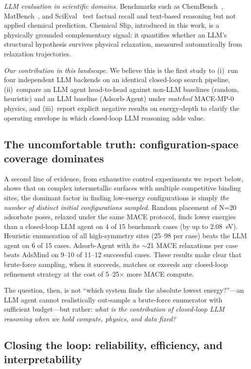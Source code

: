 \textit{LLM evaluation in scientific domains.}
Benchmarks such as ChemBench~\cite{mirza2024chembench}, MatBench~\cite{dunn2020benchmarking}, and SciEval~\cite{sun2024scieval} test factual recall and text-based reasoning but not applied chemical prediction.
Chemical Slip, introduced in this work, is a physically grounded complementary signal: it quantifies whether an LLM's structural hypothesis survives physical relaxation, measured automatically from relaxation trajectories.

\textit{Our contribution in this landscape.}
We believe this is the first study to (i)~run four independent LLM backends on an identical closed-loop search pipeline, (ii)~compare an LLM agent head-to-head against non-LLM baselines (random, heuristic) and an LLM baseline (Adsorb-Agent) under \textit{matched} MACE-MP-0 physics, and (iii)~report explicit negative results on energy-depth to clarify the operating envelope in which closed-loop LLM reasoning adds value.

\subsection{The uncomfortable truth: configuration-space coverage dominates}

A second line of evidence, from exhaustive control experiments we report below, shows that on complex intermetallic surfaces with multiple competitive binding sites, the dominant factor in finding low-energy configurations is simply \textit{the number of distinct initial configurations sampled}.
Random placement of N=20 adsorbate poses, relaxed under the same MACE protocol, finds lower energies than a closed-loop LLM agent on 4 of 15 benchmark cases (by up to 2.08~eV).
Heuristic enumeration of all high-symmetry sites (25--98 per case) beats the LLM agent on 6 of 15 cases.
Adsorb-Agent with its $\sim$21 MACE relaxations per case beats AdsMind on 9--10 of 11--12 successful cases.
These results make clear that brute-force sampling, when it succeeds, matches or exceeds any closed-loop refinement strategy at the cost of 5--25$\times$ more MACE compute.

The question, then, is not ``which system finds the absolute lowest energy?''---an LLM agent cannot realistically out-sample a brute-force enumerator with sufficient budget---but rather: \textit{what is the contribution of closed-loop LLM reasoning when we hold compute, physics, and data fixed?}

\subsection{Closing the loop: reliability, efficiency, and interpretability}

